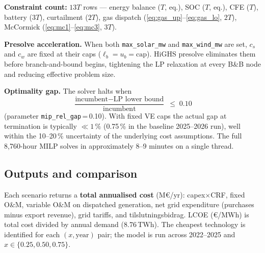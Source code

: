 \documentclass[10.5pt]{article}
\begin{document}
\smallskip
\textbf{Constraint count:} $13T$ rows — energy balance ($T$, eq.), SOC ($T$, eq.),
CFE ($T$), battery ($3T$), curtailment ($2T$), gas dispatch (\ref{eq:gas_up}--\ref{eq:gas_lo}, $2T$),
McCormick (\ref{eq:mc1}--\ref{eq:mc3}, $3T$).

\textbf{Presolve acceleration.} When both \texttt{max\_solar\_mw} and
\texttt{max\_wind\_mw} are set, $c_s$ and $c_w$ are fixed at their caps
($\ell_b = u_b = \text{cap}$). HiGHS presolve eliminates them before
branch-and-bound begins, tightening the LP relaxation at every B\&B node and
reducing effective problem size.

\textbf{Optimality gap.} The solver halts when
\[
  \frac{\text{incumbent} - \text{LP lower bound}}{\text{incumbent}} \;\leq\; 0.10
\]
(parameter \texttt{mip\_rel\_gap}\,=\,0.10). With fixed VE caps the actual gap at
termination is typically $\ll 1\,\%$ (0.75\,\% in the baseline 2025--2026 run),
well within the 10--20\,\% uncertainty of the underlying cost assumptions. The full
8{,}760-hour MILP solves in approximately 8--9 minutes on a single thread.

\subsection*{Outputs and comparison}

Each scenario returns a \textbf{total annualised cost} (M€/yr): capex$\times$CRF,
fixed O\&M, variable O\&M on dispatched generation, net grid expenditure (purchases
minus export revenue), grid tariffs, and tilslutningsbidrag. LCOE (€/MWh) is total
cost divided by annual demand (8.76\,TWh). The cheapest technology is identified for
each $(x, \text{year})$ pair; the model is run across 2022--2025 and
$x \in \{0.25, 0.50, 0.75\}$.
\end{document}
